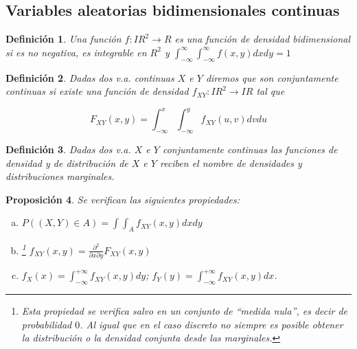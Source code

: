 \documentclass[12pt]{report}
\newtheorem{definition}{Definici\'on}
\newtheorem{proposition}[definition]{Proposici\'on}
\def\R{I\!\!R}
\begin{document}
\subsection{Variables aleatorias bidimensionales continuas}

\begin{definition}

Una función $f:\R^2\to R$ es una función de densidad bidimensional si es no negativa,  es
integrable en $R^2$ y $\int_{-\infty}^{\infty}\int_{-\infty}^{\infty} f(x,y) dx dy=1$

\end{definition}

\begin{definition}

Dadas dos v.a. continuas $X$ e $Y$ diremos que son conjuntamente continuas si existe una
función de densidad $f_{X Y}:\R^2\to \R$ tal que

$$F_{X Y}(x,y)=\int_{-\infty}^{x} \int_{-\infty}^{y} f_{X Y}(u,v) d v du$$

\end{definition}

\begin{definition}
Dadas dos v.a. $X$ e $Y$ conjuntamente continuas las funciones de densidad y de
distribución de $X$ e $Y$ reciben el nombre de densidades y distribuciones marginales.
\end{definition}



             \begin{proposition}
Se verifican las siguientes propiedades:

              \begin{enumerate}[a)]
              \item $\displaystyle P((X,Y)\in A)=\int\int_{A} f_{XY}(x,y) dx dy$
              \item 
              \footnote{ Esta propiedad se verifica salvo en un conjunto
              de ``medida nula'', es decir de probabilidad $0$.
                  Al igual que en el caso discreto no siempre es posible
                  obtener la distribución o la densidad conjunta desde las
                  marginales.} $f_{XY}(x,y)=\frac{\partial^2 }{\partial x \partial y}
              F_{XY}(x,y)$
              \item $\displaystyle f_{X}(x)=\int_{-\infty}^{+\infty} f_{XY}(x,y) dy$;
              $\displaystyle f_{Y}(y)=\int_{-\infty}^{+\infty} f_{XY}(x,y) dx$.
              \end{enumerate}
\end{proposition}
\end{document}

